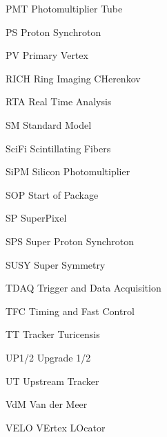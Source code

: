 \begin{abbreviations}
    \item[PMT] Photomultiplier Tube
    \item[PS] Proton Synchroton
    \item[PV] Primary Vertex
    \item[RICH] Ring Imaging CHerenkov
    \item[RTA] Real Time Analysis
    \item[SM] Standard Model
    \item[SciFi] Scintillating Fibers
    \item[SiPM] Silicon Photomultiplier
    \item[SOP] Start of Package
    \item[SP] SuperPixel
    \item[SPS] Super Proton Synchroton
    \item[SUSY] Super Symmetry
    \item[TDAQ] Trigger and Data Acquisition
    \item[TFC] Timing and Fast Control
    \item[TT] Tracker Turicensis
    \item[UP1/2] Upgrade 1/2
    \item[UT] Upstream Tracker
    \item[VdM] Van der Meer
    \item[VELO] VErtex LOcator
\end{abbreviations}

